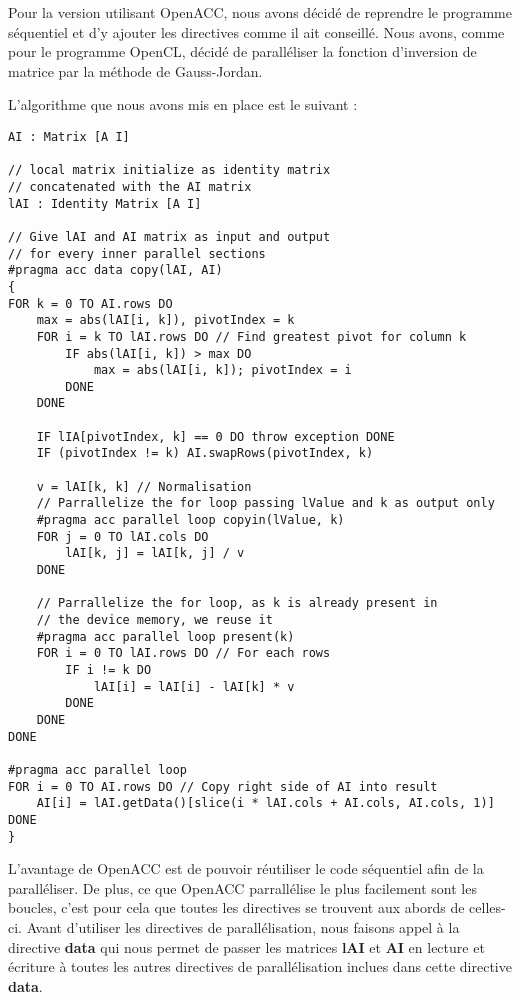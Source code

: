 \documentclass[a4paper, french]{article}
\begin{document}
Pour la version utilisant OpenACC, nous avons décidé de reprendre le programme séquentiel et d'y ajouter les directives comme il ait conseillé. Nous avons, comme pour le programme OpenCL, décidé de paralléliser la fonction d'inversion de matrice par la méthode de Gauss-Jordan.

L'algorithme que nous avons mis en place est le suivant :

\begin{lstlisting}[style=txt]
AI : Matrix [A I]

// local matrix initialize as identity matrix
// concatenated with the AI matrix
lAI : Identity Matrix [A I]

// Give lAI and AI matrix as input and output
// for every inner parallel sections
#pragma acc data copy(lAI, AI)
{
FOR k = 0 TO AI.rows DO
    max = abs(lAI[i, k]), pivotIndex = k
    FOR i = k TO lAI.rows DO // Find greatest pivot for column k
        IF abs(lAI[i, k]) > max DO
            max = abs(lAI[i, k]); pivotIndex = i
        DONE
    DONE

    IF lIA[pivotIndex, k] == 0 DO throw exception DONE
    IF (pivotIndex != k) AI.swapRows(pivotIndex, k)

    v = lAI[k, k] // Normalisation
    // Parrallelize the for loop passing lValue and k as output only
    #pragma acc parallel loop copyin(lValue, k)
    FOR j = 0 TO lAI.cols DO
        lAI[k, j] = lAI[k, j] / v
    DONE

    // Parrallelize the for loop, as k is already present in
    // the device memory, we reuse it
    #pragma acc parallel loop present(k)
    FOR i = 0 TO lAI.rows DO // For each rows
        IF i != k DO
            lAI[i] = lAI[i] - lAI[k] * v
        DONE
    DONE
DONE

#pragma acc parallel loop
FOR i = 0 TO AI.rows DO // Copy right side of AI into result
    AI[i] = lAI.getData()[slice(i * lAI.cols + AI.cols, AI.cols, 1)]
DONE
}
\end{lstlisting}

L'avantage de OpenACC est de pouvoir réutiliser le code séquentiel afin de la paralléliser. De plus, ce que OpenACC parrallélise le plus facilement sont les boucles, c'est pour cela que toutes les directives se trouvent aux abords de celles-ci. Avant d'utiliser les directives de parallélisation, nous faisons appel à la directive \textbf{data} qui nous permet de passer les matrices \textbf{lAI} et \textbf{AI} en lecture et écriture à toutes les autres directives de parallélisation inclues dans cette directive \textbf{data}.
\end{document}
